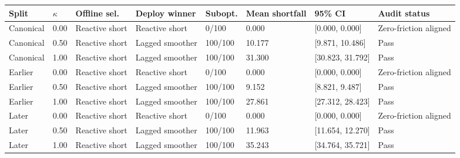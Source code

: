 \begin{tabular}{llllllll}
\toprule
Split & \(\kappa\) & Offline sel. & Deploy winner & Subopt. & Mean shortfall & 95\% CI & Audit status \\
\midrule
Canonical & 0.00 & Reactive short & Reactive short & 0/100 & 0.000 & [0.000, 0.000] & Zero-friction aligned \\
Canonical & 0.50 & Reactive short & Lagged smoother & 100/100 & 10.177 & [9.871, 10.486] & Pass \\
Canonical & 1.00 & Reactive short & Lagged smoother & 100/100 & 31.300 & [30.823, 31.792] & Pass \\
Earlier & 0.00 & Reactive short & Reactive short & 0/100 & 0.000 & [0.000, 0.000] & Zero-friction aligned \\
Earlier & 0.50 & Reactive short & Lagged smoother & 100/100 & 9.152 & [8.821, 9.487] & Pass \\
Earlier & 1.00 & Reactive short & Lagged smoother & 100/100 & 27.861 & [27.312, 28.423] & Pass \\
Later & 0.00 & Reactive short & Reactive short & 0/100 & 0.000 & [0.000, 0.000] & Zero-friction aligned \\
Later & 0.50 & Reactive short & Lagged smoother & 100/100 & 11.963 & [11.654, 12.270] & Pass \\
Later & 1.00 & Reactive short & Lagged smoother & 100/100 & 35.243 & [34.764, 35.721] & Pass \\
\bottomrule
\end{tabular}
